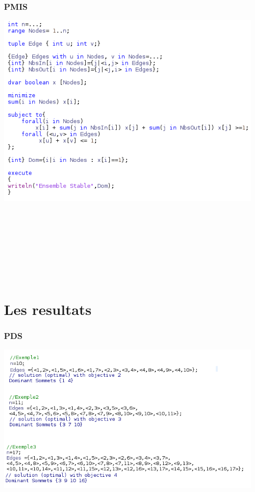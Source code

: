\documentclass{article}\author{Arthur Delain}
\begin{document}
\section{PMIS}
\includegraphics[scale=1]{PMIS.png} 
\\ \\ \\ \\ \\ \\ \\ \\ \\
\part{Les resultats}
\section{PDS}
\begin{flushleft}
\includegraphics[scale=0.75]{PDS_ex.png} 
\end{flushleft}
\end{document}
